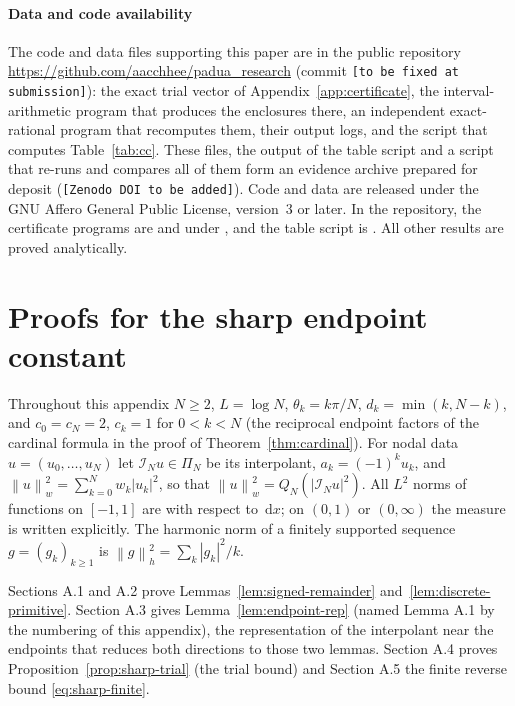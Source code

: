 \documentclass{siamart251216}
\newcommand{\Pn}{\Pi}
\newcommand{\norm}[1]{\left\lVert#1\right\rVert}
\newcommand{\dd}{\,\mathrm d}
\begin{document}
\paragraph{Data and code availability}
The code and data files supporting this paper are in the public repository
\url{https://github.com/aacchhee/padua_research} (commit
\texttt{[to be fixed at submission]}): the exact trial vector of
Appendix~\ref{app:certificate}, the interval-arithmetic program that produces
the enclosures there, an independent exact-rational program that recomputes
them, their output logs, and the script that computes Table~\ref{tab:cc}. These
files, the output of the table script and a script that re-runs and compares
all of them form an evidence archive prepared for deposit
(\texttt{[Zenodo DOI to be added]}). Code and data are released under the GNU
Affero General Public License, version~3 or later. In the repository, the
certificate programs are  and
 under
, and the table script is
. All other results are proved
analytically.

\appendix

\section{Proofs for the sharp endpoint constant}\label{app:sharp}

Throughout this appendix $N\ge2$, $L=\log N$, $\theta_k=k\pi/N$,
$d_k=\min(k,N-k)$, and $c_0=c_N=2$, $c_k=1$ for $0<k<N$ (the
reciprocal endpoint factors of the cardinal formula in the proof of
Theorem~\ref{thm:cardinal}). For nodal data $u=(u_0,\dots,u_N)$ let
$\mathcal I_Nu\in\Pn_N$ be its interpolant, $a_k=(-1)^ku_k$, and
$\norm u_w^2=\sum_{k=0}^Nw_k|u_k|^2$, so that
$\norm u_w^2=Q_N(|\mathcal I_Nu|^2)$. All $L^2$ norms of functions on
$[-1,1]$ are with respect to $\dd x$; on $(0,1)$ or $(0,\infty)$ the
measure is written explicitly. The harmonic norm of a finitely supported
sequence $g=(g_k)_{k\ge1}$ is $\norm g_h^2=\sum_k|g_k|^2/k$.

Sections A.1 and A.2 prove Lemmas~\ref{lem:signed-remainder}
and~\ref{lem:discrete-primitive}. Section A.3 gives Lemma~\ref{lem:endpoint-rep}
(named Lemma A.1 by the numbering of this appendix), the representation of
the interpolant near the endpoints that reduces both directions to those two
lemmas. Section A.4 proves Proposition~\ref{prop:sharp-trial} (the trial
bound) and Section A.5 the finite reverse bound \eqref{eq:sharp-finite}.
\end{document}
